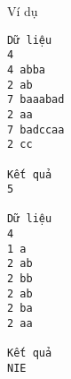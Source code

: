 Ví dụ  
\begin{verbatim}
Dữ liệu
4
4 abba
2 ab
7 baaabad
2 aa
7 badccaa
2 cc

Kết quả
5

Dữ liệu
4
1 a
2 ab
2 bb
2 ab
2 ba
2 aa

Kết quả
NIE
\end{verbatim}